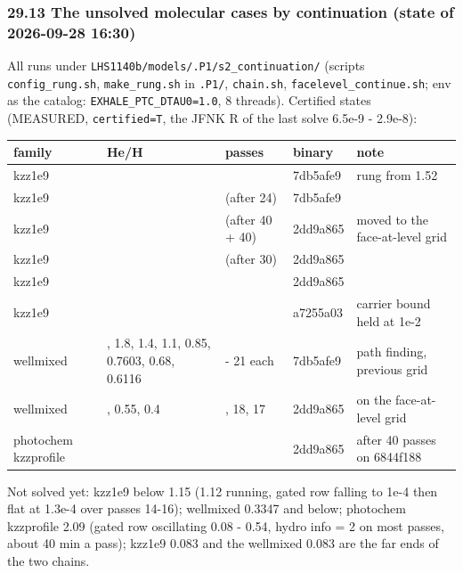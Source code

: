 \documentclass[english,a4paper]{my_memo}
\begin{document}
\subsubsection{29.13 The unsolved molecular cases by continuation (state of 2026-09-28 16:30)}\label{2913-the-unsolved-molecular-cases-by-continuation-state-of-2026-09-28-1630}

All runs under \texttt{LHS1140b/models/.P1/s2\_continuation/} (scripts \texttt{config\_rung.sh},
\texttt{make\_rung.sh} in \texttt{.P1/}, \texttt{chain.sh}, \texttt{facelevel\_continue.sh}; env as the
catalog: \texttt{EXHALE\_PTC\_DTAU0=1.0}, 8 threads). Certified states (MEASURED,
\texttt{certified=T}, the JFNK \textbar\textbar R\textbar\textbar{} of the last solve 6.5e-9 - 2.9e-8):

{\def\LTcaptype{none} %
{\small
\begin{longtable}[]{@{}>{\raggedright\arraybackslash}p{\dimexpr(\linewidth-10\tabcolsep)/5\relax}>{\raggedright\arraybackslash}p{\dimexpr(\linewidth-10\tabcolsep)/5\relax}>{\raggedright\arraybackslash}p{\dimexpr(\linewidth-10\tabcolsep)/5\relax}>{\raggedright\arraybackslash}p{\dimexpr(\linewidth-10\tabcolsep)/5\relax}>{\raggedright\arraybackslash}p{\dimexpr(\linewidth-10\tabcolsep)/5\relax}@{}}
\toprule\noalign{}
family & He/H & passes & binary & note \\
\midrule\noalign{}
\endhead
\bottomrule\noalign{}
\endlastfoot
kzz1e9 & 1.45 & 14 & 7db5afe9 & rung from 1.52 \\
kzz1e9 & 1.30 & 5 (after 24) & 7db5afe9 & \\
kzz1e9 & 1.223 & 9 (after 40 + 40) & 2dd9a865 & moved to the face-at-level grid \\
kzz1e9 & 1.186 & 24 (after 30) & 2dd9a865 & \\
kzz1e9 & 1.168 & 20 & 2dd9a865 & \\
kzz1e9 & 1.15 & 46 & a7255a03 & carrier bound held at 1e-2 \\
wellmixed & 2.13, 1.8, 1.4, 1.1, 0.85, 0.7603, 0.68, 0.6116 & 10 - 21 each & 7db5afe9 & path finding, previous grid \\
wellmixed & 0.6116, 0.55, 0.4 & 16, 18, 17 & 2dd9a865 & on the face-at-level grid \\
photochem kzzprofile & 9 & 41 & 2dd9a865 & after 40 passes on 6844f188 \\
\end{longtable}
}
}

Not solved yet: kzz1e9 below 1.15 (1.12 running, gated row falling to
1e-4 then flat at 1.3e-4 over passes 14-16); wellmixed 0.3347 and below;
photochem kzzprofile 2.09 (gated row oscillating 0.08 - 0.54, hydro info = 2
on most passes, about 40 min a pass); kzz1e9 0.083 and the wellmixed
0.083 are the far ends of the two chains.
\end{document}

